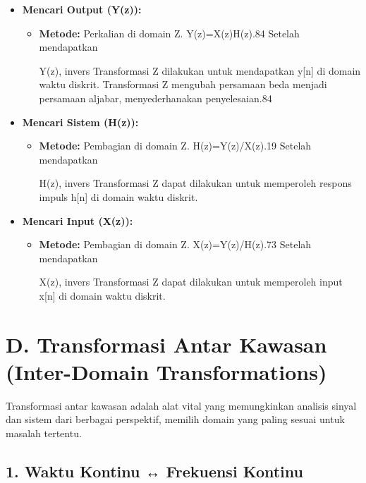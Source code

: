 \documentclass[
  letterpaper,
  DIV=11,
  numbers=noendperiod]{scrreprt}
\begin{document}
\begin{itemize}
\item
  \textbf{Mencari Output (Y(z)):}

  \begin{itemize}
  \item
    \textbf{Metode:} Perkalian di domain Z. Y(z)=X(z)H(z).84 Setelah
    mendapatkan

    Y(z), invers Transformasi Z dilakukan untuk mendapatkan y{[}n{]} di
    domain waktu diskrit. Transformasi Z mengubah persamaan beda menjadi
    persamaan aljabar, menyederhanakan penyelesaian.84
  \end{itemize}
\item
  \textbf{Mencari Sistem (H(z)):}

  \begin{itemize}
  \item
    \textbf{Metode:} Pembagian di domain Z. H(z)=Y(z)/X(z).19 Setelah
    mendapatkan

    H(z), invers Transformasi Z dapat dilakukan untuk memperoleh respons
    impuls h{[}n{]} di domain waktu diskrit.
  \end{itemize}
\item
  \textbf{Mencari Input (X(z)):}

  \begin{itemize}
  \item
    \textbf{Metode:} Pembagian di domain Z. X(z)=Y(z)/H(z).73 Setelah
    mendapatkan

    X(z), invers Transformasi Z dapat dilakukan untuk memperoleh input
    x{[}n{]} di domain waktu diskrit.
  \end{itemize}
\end{itemize}

\section{D. Transformasi Antar Kawasan (Inter-Domain
Transformations)}\label{d.-transformasi-antar-kawasan-inter-domain-transformations}

Transformasi antar kawasan adalah alat vital yang memungkinkan analisis
sinyal dan sistem dari berbagai perspektif, memilih domain yang paling
sesuai untuk masalah tertentu.

\subsection{1. Waktu Kontinu ↔ Frekuensi
Kontinu}\label{waktu-kontinu-frekuensi-kontinu}
\end{document}
